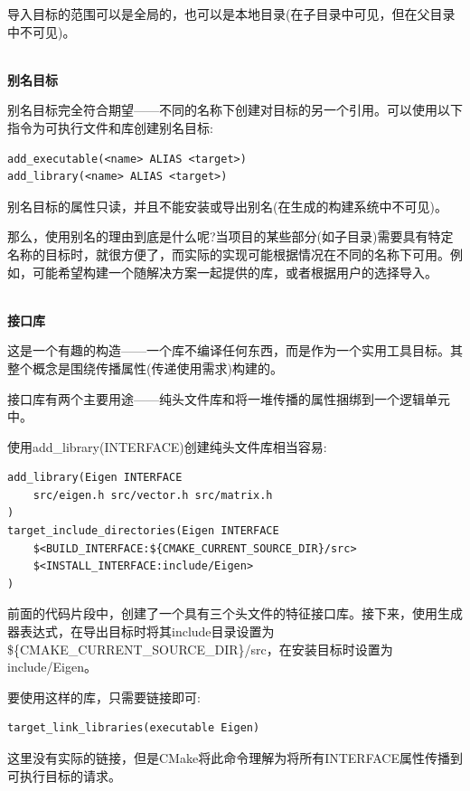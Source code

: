 导入目标的范围可以是全局的，也可以是本地目录(在子目录中可见，但在父目录中不可见)。

\hspace*{\fill} \\ %
\noindent
\textbf{别名目标}

别名目标完全符合期望——不同的名称下创建对目标的另一个引用。可以使用以下指令为可执行文件和库创建别名目标:

\begin{lstlisting}[style=styleCMake]
add_executable(<name> ALIAS <target>)
add_library(<name> ALIAS <target>)
\end{lstlisting}

别名目标的属性只读，并且不能安装或导出别名(在生成的构建系统中不可见)。

那么，使用别名的理由到底是什么呢?当项目的某些部分(如子目录)需要具有特定名称的目标时，就很方便了，而实际的实现可能根据情况在不同的名称下可用。例如，可能希望构建一个随解决方案一起提供的库，或者根据用户的选择导入。

\hspace*{\fill} \\ %
\noindent
\textbf{接口库}

这是一个有趣的构造——一个库不编译任何东西，而是作为一个实用工具目标。其整个概念是围绕传播属性(传递使用需求)构建的。

接口库有两个主要用途——纯头文件库和将一堆传播的属性捆绑到一个逻辑单元中。

使用add\_library(INTERFACE)创建纯头文件库相当容易:

\begin{lstlisting}[style=styleCMake]
add_library(Eigen INTERFACE
	src/eigen.h src/vector.h src/matrix.h
)
target_include_directories(Eigen INTERFACE
	$<BUILD_INTERFACE:${CMAKE_CURRENT_SOURCE_DIR}/src>
	$<INSTALL_INTERFACE:include/Eigen>
)
\end{lstlisting}

前面的代码片段中，创建了一个具有三个头文件的特征接口库。接下来，使用生成器表达式，在导出目标时将其include目录设置为\$\{CMAKE\_CURRENT\_SOURCE\_DIR\}/src，在安装目标时设置为include/Eigen。

要使用这样的库，只需要链接即可:

\begin{lstlisting}[style=styleCMake]
target_link_libraries(executable Eigen)
\end{lstlisting}

这里没有实际的链接，但是CMake将此命令理解为将所有INTERFACE属性传播到可执行目标的请求。

